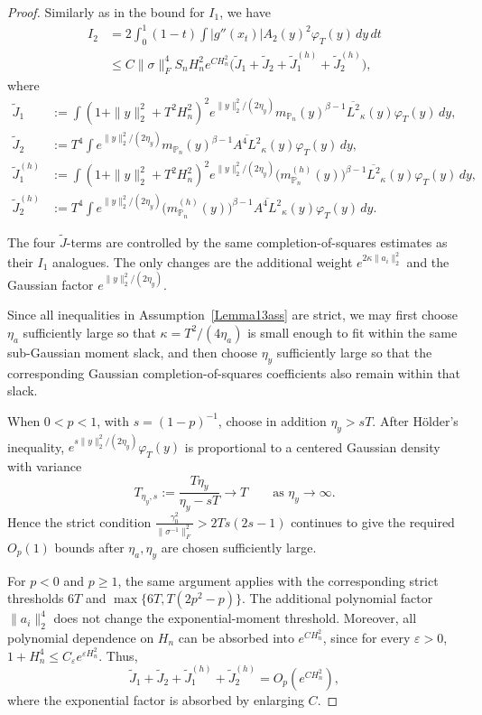 \documentclass[11pt]{article}
\theoremstyle{definition}
\begin{document}
\begin{proof}
Similarly as in the bound for $I_1$, we have
\begin{align*}
I_2
&=
2\!\int_0^1(1-t)
\int |g''(x_t)|A_2(y)^2\varphi_T(y)\,dy\,dt\\
&\le
C\|\sigma\|_F^4S_nH_n^2e^{CH_n^2}
\Big(
\widetilde J_1+\widetilde J_2
+\widetilde J_1^{(h)}+\widetilde J_2^{(h)}
\Big),
\end{align*}
where
\begin{align*}
\widetilde J_1
&:=
\int
(1+\|y\|_2^2+T^2H_n^2)^2
e^{\|y\|_2^2/(2\eta_y)}
m_{\mathbb P_n}(y)^{\beta-1}
\overline{L^2}_{\kappa}(y)
\varphi_T(y)\,dy,\\
\widetilde J_2
&:=
T^4\int
e^{\|y\|_2^2/(2\eta_y)}
m_{\mathbb P_n}(y)^{\beta-1}
\overline{A^4L^2}_{\kappa}(y)
\varphi_T(y)\,dy,\\
\widetilde J_1^{(h)}
&:=
\int
(1+\|y\|_2^2+T^2H_n^2)^2
e^{\|y\|_2^2/(2\eta_y)}
\big(m_{\mathbb P_n}^{(h)}(y)\big)^{\beta-1}
\overline{L^2}_{\kappa}(y)
\varphi_T(y)\,dy,\\
\widetilde J_2^{(h)}
&:=
T^4\int
e^{\|y\|_2^2/(2\eta_y)}
\big(m_{\mathbb P_n}^{(h)}(y)\big)^{\beta-1}
\overline{A^4L^2}_{\kappa}(y)
\varphi_T(y)\,dy.
\end{align*}

{
The four $\widetilde J$-terms are controlled by the same
completion-of-squares estimates as their $I_1$ analogues.
The only changes are the additional weight
$e^{2\kappa\|a_i\|_2^2}$ and the Gaussian factor
$e^{\|y\|_2^2/(2\eta_y)}$.

Since all inequalities in Assumption~\ref{Lemma13ass} are strict,
we may first choose $\eta_a$ sufficiently large so that
$\kappa=T^2/(4\eta_a)$ is small enough to fit within the same
sub-Gaussian moment slack, and then choose $\eta_y$ sufficiently
large so that the corresponding Gaussian completion-of-squares
coefficients also remain within that slack.

When $0<p<1$, with $s=(1-p)^{-1}$, choose in addition
$\eta_y>sT$. After H\"older's inequality, $e^{s\|y\|_2^2/(2\eta_y)}\varphi_T(y)$
is proportional to a centered Gaussian density with variance
\[
T_{\eta_y,s}
:=
\frac{T\eta_y}{\eta_y-sT}
\longrightarrow T
\qquad\text{as }\eta_y\to\infty.
\]
Hence the strict condition $\frac{\gamma_0^2}{\|\sigma^{-1}\|_F^2}
>
2Ts(2s-1)$
continues to give the required $O_p(1)$ bounds after
$\eta_a,\eta_y$ are chosen sufficiently large.

For $p<0$ and $p\ge1$, the same argument applies with the
corresponding strict thresholds $6T$ and $\max\{6T,T(2p^2-p)\}.$
The additional polynomial factor $\|a_i\|_2^4$ does not change
the exponential-moment threshold. Moreover, all polynomial
dependence on $H_n$ can be absorbed into $e^{CH_n^2}$, since
for every $\varepsilon>0$, $1+H_n^4\le C_\varepsilon e^{\varepsilon H_n^2}.$
Thus,
\[
\widetilde J_1+\widetilde J_2+
\widetilde J_1^{(h)}+\widetilde J_2^{(h)}
=
O_p(e^{CH_n^2}),
\]
where the exponential factor is absorbed by enlarging $C$.
}


\end{proof}
\end{document}
